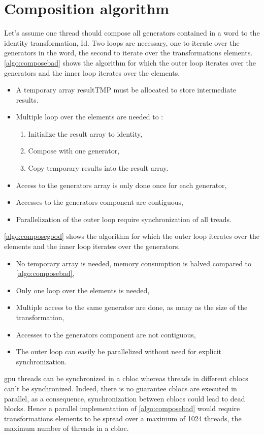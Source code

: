 {\section{Composition algorithm}
Let's assume one thread should compose all generators contained in a word to the identity transformation, Id. Two loops are necessary, one to iterate over the generators in the word, the second to iterate over the transformations elements.
\autoref{algo:composebad} shows the algorithm for which the outer loop iterates over the generators and the inner loop iterates over the elements.
\begin{itemize}
\item A temporary array resultTMP must be allocated to store intermediate results.
\item Multiple loop over the elements are needed to :
\begin{enumerate}
 \item Initialize the result array to identity,
 \item Compose with one generator,
 \item Copy temporary results into the result array.
 \end{enumerate}
\item Access to the generators array is only done once for each generator,
 \item Accesses to the generators component are contiguous,
 \item Parallelization of the outer loop require synchronization of all treads.
\end{itemize}
\autoref{algo:composegood} shows the algorithm for which the outer loop iterates over the elements and the inner loop iterates over the generators.
\begin{itemize}
 \item No temporary array is needed, memory consumption is halved compared to \autoref{algo:composebad},
 \item Only one loop over the elements is needed,
 \item Multiple access to the same generator are done, as many as the size of the transformation,
 \item Accesses to the generators component are not contiguous,
 \item The outer loop can easily be parallelized without need for explicit synchronization.
\end{itemize}
\gls{gpu} threads can be synchronized in a \gls{cbloc} whereas threads in different \glspl{cbloc} can't be synchronized. Indeed, there is no guarantee \glspl{cbloc} are executed in parallel, as a consequence, synchronization between \glspl{cbloc} could lead to dead blocks. Hence a parallel implementation of \autoref{algo:composebad} would require transformations elements to be spread over a maximum of 1024 threads, the maximum number of threads in a \gls{cbloc}.

}
